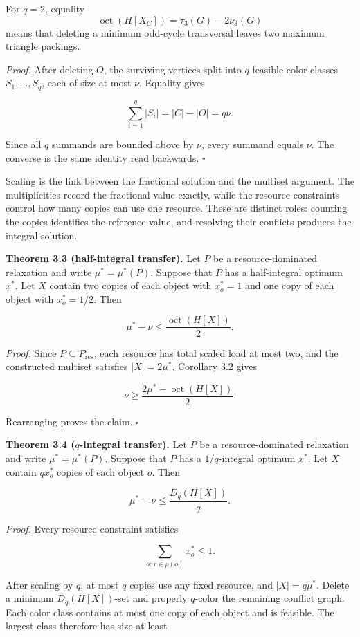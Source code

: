 \documentclass[english,11pt,a4paper]{article}
\begin{document}
For \(q=2\), equality \[
\operatorname{oct}(H[X_C])=\tau_3(G)-2\nu_3(G)
\] means that deleting a minimum odd-cycle transversal leaves two
maximum triangle packings.

\emph{Proof.} After deleting \(O\), the surviving vertices split into
\(q\) feasible color classes \(S_1,\ldots,S_q\), each of size at most
\(\nu\). Equality gives

\[
\sum_{i=1}^q |S_i|=|C|-|O|=q\nu.
\]

Since all \(q\) summands are bounded above by \(\nu\), every summand
equals \(\nu\). The converse is the same identity read backwards.
\(\square\)

Scaling is the link between the fractional solution and the multiset
argument. The multiplicities record the fractional value exactly, while
the resource constraints control how many copies can use one resource.
These are distinct roles: counting the copies identifies the reference
value, and resolving their conflicts produces the integral solution.

\textbf{Theorem 3.3 (half-integral transfer).} Let \(P\) be a
resource-dominated relaxation and write \(\mu^*=\mu^*(P)\). Suppose that
\(P\) has a half-integral optimum \(x^*\). Let \(X\) contain two copies
of each object with \(x_o^*=1\) and one copy of each object with
\(x_o^*=1/2\). Then

\[
\mu^*-\nu
\le
\frac{\operatorname{oct}(H[X])}{2}.
\]

\emph{Proof.} Since \(P\subseteq P_{\mathrm{res}}\), each resource has
total scaled load at most two, and the constructed multiset satisfies
\(|X|=2\mu^*\). Corollary 3.2 gives

\[
\nu
\ge
\frac{2\mu^*-\operatorname{oct}(H[X])}{2}.
\]

Rearranging proves the claim. \(\square\)

\textbf{Theorem 3.4 (\(q\)-integral transfer).} Let \(P\) be a
resource-dominated relaxation and write \(\mu^*=\mu^*(P)\). Suppose that
\(P\) has a \(1/q\)-integral optimum \(x^*\). Let \(X\) contain
\(qx_o^*\) copies of each object \(o\). Then

\[
\mu^*-\nu
\le
\frac{D_q(H[X])}{q}.
\]

\emph{Proof.} Every resource constraint satisfies

\[
\sum_{o:\,r\in\rho(o)}x_o^*\le1.
\]

After scaling by \(q\), at most \(q\) copies use any fixed resource, and
\(|X|=q\mu^*\). Delete a minimum \(D_q(H[X])\)-set and properly
\(q\)-color the remaining conflict graph. Each color class contains at
most one copy of each object and is feasible. The largest class
therefore has size at least
\end{document}
